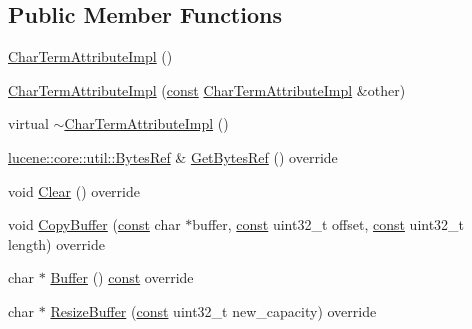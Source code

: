 \subsection*{Public Member Functions}
\begin{DoxyCompactItemize}
\item 
\mbox{\hyperlink{classlucene_1_1core_1_1analysis_1_1tokenattributes_1_1CharTermAttributeImpl_a3f0f1dfd6edd1686f46fa84b95b17959}{Char\+Term\+Attribute\+Impl}} ()
\item 
\mbox{\hyperlink{classlucene_1_1core_1_1analysis_1_1tokenattributes_1_1CharTermAttributeImpl_af846d32513f9e11a0b7443ea0ba41487}{Char\+Term\+Attribute\+Impl}} (\mbox{\hyperlink{ZlibCrc32_8h_a2c212835823e3c54a8ab6d95c652660e}{const}} \mbox{\hyperlink{classlucene_1_1core_1_1analysis_1_1tokenattributes_1_1CharTermAttributeImpl}{Char\+Term\+Attribute\+Impl}} \&other)
\item 
virtual \mbox{\hyperlink{classlucene_1_1core_1_1analysis_1_1tokenattributes_1_1CharTermAttributeImpl_aef0a9228f5cf3d4ad4c33d97f2a9a13b}{$\sim$\+Char\+Term\+Attribute\+Impl}} ()
\item 
\mbox{\hyperlink{classlucene_1_1core_1_1util_1_1BytesRef}{lucene\+::core\+::util\+::\+Bytes\+Ref}} \& \mbox{\hyperlink{classlucene_1_1core_1_1analysis_1_1tokenattributes_1_1CharTermAttributeImpl_aefef8491e2a12493480fe19dd6d61ca7}{Get\+Bytes\+Ref}} () override
\item 
void \mbox{\hyperlink{classlucene_1_1core_1_1analysis_1_1tokenattributes_1_1CharTermAttributeImpl_a4e0b1a5a06996822798414f3a41af6e6}{Clear}} () override
\item 
void \mbox{\hyperlink{classlucene_1_1core_1_1analysis_1_1tokenattributes_1_1CharTermAttributeImpl_aacb3a44d6999a381dc9217616ba91317}{Copy\+Buffer}} (\mbox{\hyperlink{ZlibCrc32_8h_a2c212835823e3c54a8ab6d95c652660e}{const}} char $\ast$buffer, \mbox{\hyperlink{ZlibCrc32_8h_a2c212835823e3c54a8ab6d95c652660e}{const}} uint32\+\_\+t offset, \mbox{\hyperlink{ZlibCrc32_8h_a2c212835823e3c54a8ab6d95c652660e}{const}} uint32\+\_\+t length) override
\item 
char $\ast$ \mbox{\hyperlink{classlucene_1_1core_1_1analysis_1_1tokenattributes_1_1CharTermAttributeImpl_af6663b6b4481ee51bd166f5c3123f9f8}{Buffer}} () \mbox{\hyperlink{ZlibCrc32_8h_a2c212835823e3c54a8ab6d95c652660e}{const}} override
\item 
char $\ast$ \mbox{\hyperlink{classlucene_1_1core_1_1analysis_1_1tokenattributes_1_1CharTermAttributeImpl_abc195e8927e23632d34d4c081ede76b4}{Resize\+Buffer}} (\mbox{\hyperlink{ZlibCrc32_8h_a2c212835823e3c54a8ab6d95c652660e}{const}} uint32\+\_\+t new\+\_\+capacity) override

\end{DoxyCompactItemize}
